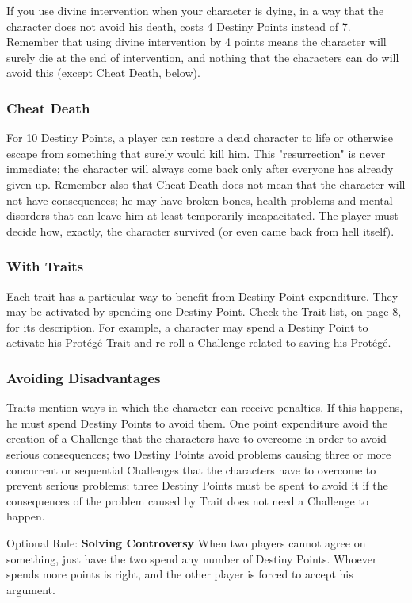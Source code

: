 \begin{multicols}{2}
If you use divine intervention when your
character is dying, in a way that the character does
not avoid his death, costs 4 Destiny Points instead
of 7. Remember that using divine intervention by
4 points means the character will surely die at the
end of intervention, and nothing that the
characters can do will avoid this (except Cheat
Death, below).

\subsubsection{Cheat Death}
For 10 Destiny Points, a player can restore
a dead character to life or otherwise escape from
something that surely would kill him. This
"resurrection" is never immediate; the character
will always come back only after everyone has
already given up. Remember also that Cheat Death
does not mean that the character will not have
consequences; he may have broken bones, health
problems and mental disorders that can leave him
at least temporarily incapacitated. The player
must decide how, exactly, the character survived
(or even came back from hell itself).

\subsubsection{With Traits}
Each trait has a particular way to benefit
from Destiny Point expenditure. They may be
activated by spending one Destiny Point. Check the
Trait list, on page 8, for its description. For
example, a character may spend a Destiny Point to
activate his Protégé Trait and re-roll a Challenge
related to saving his Protégé.

\subsubsection{Avoiding Disadvantages}
Traits mention ways in which the
character can receive penalties. If this happens, he
must spend Destiny Points to avoid them. One
point expenditure avoid the creation of a
Challenge that the characters have to overcome in
order to avoid serious consequences; two Destiny
Points avoid problems causing three or more
concurrent or sequential Challenges that the
characters have to overcome to prevent serious
problems; three Destiny Points must be spent to
avoid it if the consequences of the problem caused
by Trait does not need a Challenge to happen.

\begin{boco}
Optional Rule: \textbf{Solving Controversy}
When two players cannot agree on
something, just have the two spend any number
of Destiny Points. Whoever spends more points
is right, and the other player is forced to accept
his argument.
\end{boco}
\end{multicols}

